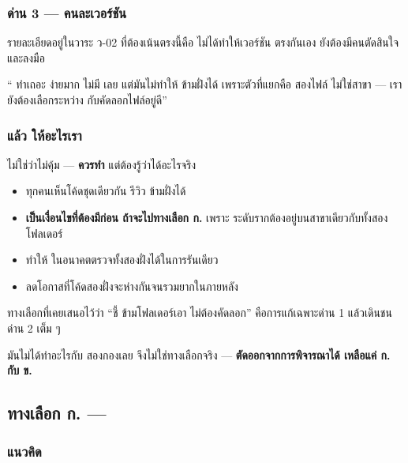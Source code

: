 \subsubsection{ด่าน 3 ---  คนละเวอร์ชัน}

รายละเอียดอยู่ในวาระ ว-02 ที่ต้องเน้นตรงนี้คือ  ไม่ได้ทำให้เวอร์ชัน
ตรงกันเอง ยังต้องมีคนตัดสินใจและลงมือ

\begin{keybox}[title={ประโยคที่ใช้ตอบในห้องประชุมได้เลย}]
`` ทำเถอะ ง่ายมาก ไม่มี  เลย แต่มันไม่ทำให้
 ข้ามฝั่งได้ เพราะตัวที่แยกคือ  สองไฟล์
ไม่ใช่สาขา --- เรายังต้องเลือกระหว่าง  กับคัดลอกไฟล์อยู่ดี''
\end{keybox}

\subsubsection{แล้ว  ให้อะไรเรา}

ไม่ใช่ว่าไม่คุ้ม ---  \textbf{ควรทำ} แต่ต้องรู้ว่าได้อะไรจริง

\begin{itemize}
\item ทุกคนเห็นโค้ดชุดเดียวกัน รีวิว  ข้ามฝั่งได้
\item \textbf{เป็นเงื่อนไขที่ต้องมีก่อน ถ้าจะไปทางเลือก ก.} เพราะ
       ระดับรากต้องอยู่บนสาขาเดียวกับทั้งสองโฟลเดอร์
\item ทำให้  ในอนาคตตรวจทั้งสองฝั่งได้ในการรันเดียว
\item ลดโอกาสที่โค้ดสองฝั่งจะห่างกันจนรวมยากในภายหลัง
\end{itemize}

\begin{badbox}[title={ทางเลือก ค. (\code{paths} ใน \code{tsconfig}) ตายตรงด่าน 2}]
ทางเลือกที่เคยเสนอไว้ว่า ``ชี้  ข้ามโฟลเดอร์เอา ไม่ต้องคัดลอก''
คือการแก้เฉพาะด่าน 1 แล้วเดินชนด่าน 2 เต็ม ๆ

มันไม่ได้ทำอะไรกับ  สองกองเลย จึงไม่ใช่ทางเลือกจริง
--- \textbf{ตัดออกจากการพิจารณาได้ เหลือแค่ ก. กับ ข.}
\end{badbox}

\subsection{ทางเลือก ก. --- }

\subsubsection{แนวคิด}

